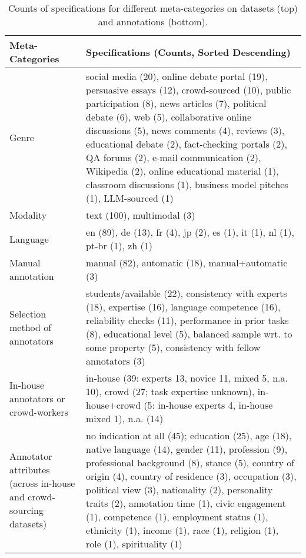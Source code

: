 \begin{table}[t]
\centering
\small\renewcommand{\arraystretch}{1.2}
\setlength{\tabcolsep}{2pt}
\scriptsize
\begin{tabular}{P{2cm}p{5.4cm}}
\toprule
\bf Meta-Categories & \bf Specifications (Counts, Sorted Descending)\\
\midrule
Genre	&  social media (20), online debate portal	(19), persuasive essays	(12), crowd-sourced	(10), public participation (8), news articles (7), political debate	(6), web (5), collaborative online discussions (5), news comments (4), reviews (3), educational debate (2), fact-checking portals (2), QA forums (2), e-mail communication (2), Wikipedia (2), online educational material (1), classroom discussions (1), business model pitches (1), LLM-sourced (1) \\
Modality & text (100), multimodal (3)\\
Language & en (89), de (13), fr (4), jp (2), es (1), it (1), nl (1), pt-br (1), zh (1)\\
\midrule
Manual annotation & manual (82), automatic (18), manual+automatic (3)\\
Selection method of annotators & students/available	(22), consistency with experts (18), expertise (16), language competence (16), reliability checks (11), performance in prior tasks (8), educational level (5), balanced sample wrt. to some property (5), consistency with fellow annotators (3)\\
In-house annotators or crowd-workers & in-house (39: experts 13, novice 11, mixed 5, n.a. 10), crowd (27; task expertise unknown), in-house+crowd (5: in-house experts 4, in-house mixed 1), n.a. (14)\\
Annotator attributes (across in-house and crowd-sourcing  datasets) & no indication at all (45); education (25), age (18), native language (14), gender (11), profession (9), professional background (8), stance (5), country of origin (4), country of residence (3), occupation (3), political view (3), nationality (2), personality traits (2), annotation time (1), civic engagement (1), competence (1), employment status (1), ethnicity (1), income (1), race (1), religion (1),  role (1), spirituality (1)\\
\bottomrule
\end{tabular}
\caption{Counts of specifications for different meta-categories on datasets (top) and annotations (bottom).}
\label{tab:dataset-stats}
\end{table}

